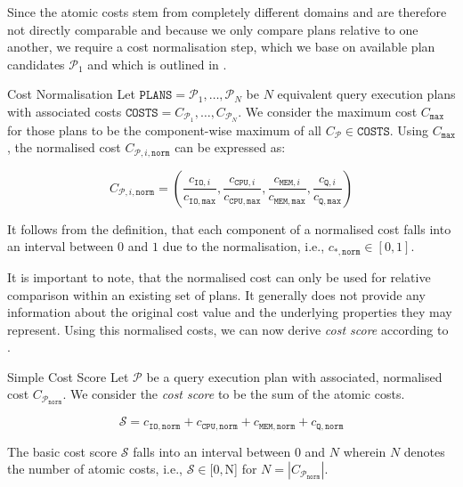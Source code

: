 Since the atomic costs stem from completely different domains and are therefore not directly comparable and because we only compare plans relative to one another, we require a cost normalisation step, which we base on available plan candidates $\mathcal{P}_1$ and which is outlined in .

\begin{definition}[label=definition:cost_normalisation]{Cost Normalisation}{}
    Let $\mathtt{PLANS} = \mathcal{P}_1, \ldots, \mathcal{P}_N$ be $N$ equivalent query execution plans with associated costs $\mathtt{COSTS} =C_{\mathcal{P}_1}, \ldots,C_{\mathcal{P}_N}$. We consider the maximum cost $C_{\mathtt{max}}$ for those plans to be the component-wise maximum of all $C_{\mathcal{P}} \in \mathtt{COSTS}$. Using $C_{\mathtt{max}}$, the normalised cost $ C_{\mathcal{P},i,\mathtt{norm}}$ can be expressed as:

    \begin{equation*}
        C_{\mathcal{P},i,\mathtt{norm}} = (\frac{c_{\mathtt{IO},i}}{c_{\mathtt{IO},\mathtt{max}}},\frac{c_{\mathtt{CPU},i}}{c_{\mathtt{CPU},\mathtt{max}}},\frac{c_{\mathtt{MEM},i}}{c_{\mathtt{MEM},\mathtt{max}}},\frac{c_{\mathtt{Q},i}}{c_{\mathtt{Q},\mathtt{max}}})
    \end{equation*}

    It follows from the definition, that each component of a normalised cost falls into an interval between $0$ and $1$ due to the normalisation, i.e., $c_{\mathtt{*},\mathtt{norm}} \in [ 0, 1 ]$.
\end{definition}

It is important to note, that the normalised cost can only be used for relative comparison within an existing set of plans. It generally does not provide any information about the original cost value and the underlying properties they may represent. Using this normalised costs, we can now derive \emph{cost score} according to .

\begin{definition}[label=definition:cost_score]{Simple Cost Score}{}
    Let $\mathcal{P}$  be a query execution plan with associated, normalised cost $C_{\mathcal{P}_{\mathtt{norm}}}$. We consider the \emph{cost score} to be the sum of the atomic costs.

    \begin{equation*}
        \mathcal{S} = c_{\mathtt{IO},\mathtt{norm}} + c_{\mathtt{CPU},\mathtt{norm}} + c_{\mathtt{MEM},\mathtt{norm}} + c_{\mathtt{Q},\mathtt{norm}}
    \end{equation*}

    The basic cost score $ \mathcal{S}$ falls into an interval between $0$ and $N$ wherein $N$ denotes the number of atomic costs, i.e., $\mathcal{S} \in [0, $N] for $N = |C_{\mathcal{P}_{\mathtt{norm}}}|$.
\end{definition}

